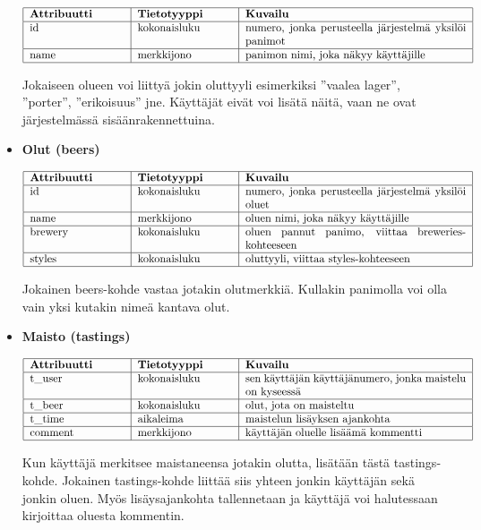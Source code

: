 \documentclass[12pt]{article}
\begin{document}
\begin{itemize}
\[
  \begin{tabular}{|p{3cm}|p{3cm}|p{7cm}|}\hline
   \textbf{Attribuutti} & \textbf{Tietotyyppi} & \textbf{Kuvailu} \\ \hline
    id & kokonaisluku & numero, jonka perusteella järjestelmä yksilöi panimot \\ \hline
    name & merkkijono & panimon nimi, joka näkyy käyttäjille \\ \hline
  \end{tabular}
\]

Jokaiseen olueen voi liittyä jokin oluttyyli esimerkiksi ''vaalea lager'', ''porter'', ''erikoisuus'' jne. Käyttäjät eivät voi lisätä näitä, vaan ne ovat järjestelmässä sisäänrakennettuina.

\item \textbf{Olut (beers)}

\[
  \begin{tabular}{|p{3cm}|p{3cm}|p{7cm}|}\hline
   \textbf{Attribuutti} & \textbf{Tietotyyppi} & \textbf{Kuvailu} \\ \hline
    id & kokonaisluku & numero, jonka perusteella järjestelmä yksilöi oluet \\ \hline
    name & merkkijono & oluen nimi, joka näkyy käyttäjille \\ \hline
    brewery & kokonaisluku & oluen pannut panimo, viittaa breweries-kohteeseen \\ \hline
    styles & kokonaisluku & oluttyyli, viittaa styles-kohteeseen \\ \hline
  \end{tabular}
\]

Jokainen beers-kohde vastaa jotakin olutmerkkiä. Kullakin panimolla voi olla vain yksi kutakin nimeä kantava olut.

\item \textbf{Maisto (tastings)}

  \[
  \begin{tabular}{|p{3cm}|p{3cm}|p{7cm}|}\hline
    \textbf{Attribuutti} & \textbf{Tietotyyppi} & \textbf{Kuvailu} \\ \hline
    t\_user & kokonaisluku & sen käyttäjän käyttäjänumero, jonka maistelu on kyseessä \\ \hline
    t\_beer & kokonaisluku & olut, jota on maisteltu \\ \hline
    t\_time & aikaleima & maistelun lisäyksen ajankohta \\ \hline
    comment & merkkijono & käyttäjän oluelle lisäämä kommentti \\ \hline
  \end{tabular}
  \]

Kun käyttäjä merkitsee maistaneensa jotakin olutta, lisätään tästä tastings-kohde. Jokainen tastings-kohde liittää siis yhteen jonkin käyttäjän sekä jonkin oluen. Myös lisäysajankohta tallennetaan ja käyttäjä voi halutessaan kirjoittaa oluesta kommentin.

\end{itemize}
\end{document}
